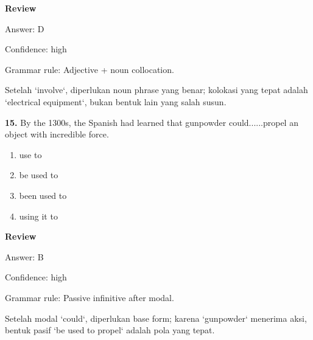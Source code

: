 \documentclass[12pt]{article}
\begin{document}
\par
\begingroup
\setlength{\parskip}{0pt}
\setlength{\parindent}{0pt}
\textbf{Review}\par
Answer: D\par
Confidence: high\par
Grammar rule: Adjective + noun collocation.\par
Setelah `involve`, diperlukan noun phrase yang benar; kolokasi yang tepat adalah `electrical equipment`, bukan bentuk lain yang salah susun.\par
\endgroup
\par
\vspace{0.25\baselineskip}
\noindent\textbf{15.} By the 1300s, the Spanish had learned that gunpowder could......propel an object with incredible force.
\begin{enumerate}[label=(\Alph*),leftmargin=*,itemsep=0.2em]
\item use to
\item be used to
\item been used to
\item using it to
\end{enumerate}
\par
\begingroup
\setlength{\parskip}{0pt}
\setlength{\parindent}{0pt}
\textbf{Review}\par
Answer: B\par
Confidence: high\par
Grammar rule: Passive infinitive after modal.\par
Setelah modal `could`, diperlukan base form; karena `gunpowder` menerima aksi, bentuk pasif `be used to propel` adalah pola yang tepat.\par
\endgroup
\par
\vspace{0.25\baselineskip}
\end{document}
